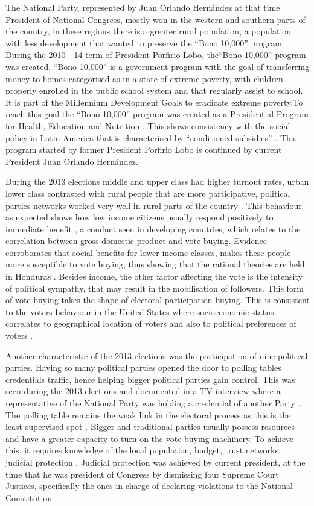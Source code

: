 \documentclass[letterpaper,10pt]{article}
\begin{document}
The National Party, represented by Juan Orlando Hernández at that time President of National Congress, mostly won in the western and southern parts of the country, in these regions there is a greater rural population, a population with less development that wanted to preserve the ``Bono 10,000'' program. During the 2010 - 14 term of President Porfirio Lobo, the``Bono 10,000'' program was created. ``Bono 10,000'' is a government program with the goal of transferring money to homes categorised as in a state of extreme poverty, with children properly enrolled in the public school system and that regularly assist to school. It is part of the Millennium Development Goals \citep{mdg2006} to eradicate extreme poverty.To reach this goal the ``Bono 10,000'' program was created as a Presidential Program for Health, Education and Nutrition \citep{bono10k}. This shows consistency with the social policy in Latin America that is characterised by ``conditioned subsidies'' \citep{romero2014}. This program started by former President Porfirio Lobo is continued by current President Juan Orlando Hern\'{a}ndez. 

During the 2013 elections middle and upper class had higher turnout rates, urban lower class contrasted with rural people that are more participative, political parties networks worked very well in rural parts of the country \citep{romero2014}. This behaviour as expected shows how low income citizens usually respond positively to immediate benefit \citep{kit2000}, a conduct seen in developing countries, which relates to the correlation between gross domestic product and vote buying. Evidence corroborates that social benefits for lower income classes, makes these people more susceptible to vote buying, thus showing that the rational theories are held in Honduras \citep{gonza2014}. Besides income, the other factor affecting the vote is the intensity of political sympathy, that may result in the mobilisation of followers. This form of vote buying takes the shape of electoral participation buying. This is consistent to the voters behaviour in the United States where socioeconomic status correlates to geographical location of voters and also to political preferences of voters \citep{osborn2010}.

Another characteristic of the 2013 elections was the participation of nine political parties. Having so many political parties opened the door to polling tables credentials traffic, hence helping bigger political parties gain control. This was seen during the 2013 elections and documented in a TV interview where a representative of the National Party was holding a credential of another Party \citep{vidap}. The polling table remains the weak link in the electoral process as this is the least supervised spot \citep{romero2014}. Bigger and traditional parties usually possess resources and have a greater capacity to turn on the vote buying machinery. To achieve this, it requires knowledge of the local population, budget, trust networks, judicial protection \citep{gonza2014}. Judicial protection was achieved by current president, at the time that he was president of Congress by dismissing four Supreme Court Justices, specifically the ones in charge of declaring violations to the National Constitution \citep{csj2012}.
\end{document}
